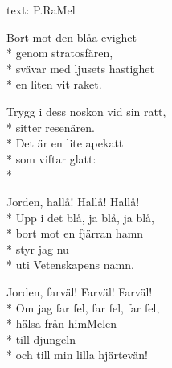 \begin{SongText}[Rymdraketsvalsen]
    \begin{SongInfo}
        text: P.RaMel
    \end{SongInfo}
    \begin{SongVerse}
        Bort mot den blåa evighet\\*%
        genom stratosfären,\\*%
        svävar med ljusets hastighet\\*%
        en liten vit raket.
    \end{SongVerse}
    \begin{SongVerse}
        Trygg i dess noskon vid sin ratt,\\*%
        sitter resenären.\\*%
        Det är en lite apekatt\\*%
        som viftar glatt:\\*%
    \end{SongVerse}
    \begin{SongVerse}
        Jorden, hallå! Hallå! Hallå!\\*%
        Upp i det blå, ja blå, ja blå,\\*%
        bort mot en fjärran hamn\\*%
        styr jag nu\\*%
        uti Vetenskapens namn.
    \end{SongVerse}
    \begin{SongVerse}
        Jorden, farväl! Farväl! Farväl!\\*%
        Om jag far fel, far fel, far fel,\\*%
        hälsa från himMelen\\*%
        till djungeln\\*%
        och till min lilla hjärtevän!
    \end{SongVerse}
\end{SongText}